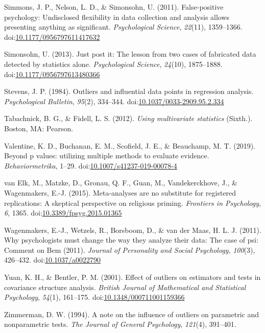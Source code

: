 \documentclass[english,,man,mask]{apa6}
\theoremstyle{definition}
\theoremstyle{definition}
\theoremstyle{definition}
\theoremstyle{remark}
\begin{document}
\hypertarget{ref-Simmons2011}{}
Simmons, J. P., Nelson, L. D., \& Simonsohn, U. (2011). False-positive
psychology: Undisclosed flexibility in data collection and analysis
allows presenting anything as significant. \emph{Psychological Science},
\emph{22}(11), 1359--1366.
doi:\href{https://doi.org/10.1177/0956797611417632}{10.1177/0956797611417632}

\hypertarget{ref-Simonsohn2013}{}
Simonsohn, U. (2013). Just post it: The lesson from two cases of
fabricated data detected by statistics alone. \emph{Psychological
Science}, \emph{24}(10), 1875--1888.
doi:\href{https://doi.org/10.1177/0956797613480366}{10.1177/0956797613480366}

\hypertarget{ref-Stevens1984}{}
Stevens, J. P. (1984). Outliers and influential data points in
regression analysis. \emph{Psychological Bulletin}, \emph{95}(2),
334--344.
doi:\href{https://doi.org/10.1037/0033-2909.95.2.334}{10.1037/0033-2909.95.2.334}

\hypertarget{ref-Tabachnick2012}{}
Tabachnick, B. G., \& Fidell, L. S. (2012). \emph{Using multivariate
statistics} (Sixth.). Boston, MA: Pearson.

\hypertarget{ref-Valentine2017}{}
Valentine, K. D., Buchanan, E. M., Scofield, J. E., \& Beauchamp, M. T.
(2019). Beyond p values: utilizing multiple methods to evaluate
evidence. \emph{Behaviormetrika}, 1--29.
doi:\href{https://doi.org/10.1007/s41237-019-00078-4}{10.1007/s41237-019-00078-4}

\hypertarget{ref-VanElk2015}{}
van Elk, M., Matzke, D., Gronau, Q. F., Guan, M., Vandekerckhove, J., \&
Wagenmakers, E.-J. (2015). Meta-analyses are no substitute for
registered replications: A skeptical perspective on religious priming.
\emph{Frontiers in Psychology}, \emph{6}, 1365.
doi:\href{https://doi.org/10.3389/fpsyg.2015.01365}{10.3389/fpsyg.2015.01365}

\hypertarget{ref-Wagenmakers2011a}{}
Wagenmakers, E.-J., Wetzels, R., Borsboom, D., \& van der Maas, H. L. J.
(2011). Why psychologists must change the way they analyze their data:
The case of psi: Comment on Bem (2011). \emph{Journal of Personality and
Social Psychology}, \emph{100}(3), 426--432.
doi:\href{https://doi.org/10.1037/a0022790}{10.1037/a0022790}

\hypertarget{ref-Yuan2001}{}
Yuan, K. H., \& Bentler, P. M. (2001). Effect of outliers on estimators
and tests in covariance structure analysis. \emph{British Journal of
Mathematical and Statistical Psychology}, \emph{54}(1), 161--175.
doi:\href{https://doi.org/10.1348/000711001159366}{10.1348/000711001159366}

\hypertarget{ref-Zimmerman1994}{}
Zimmerman, D. W. (1994). A note on the influence of outliers on
parametric and nonparametric tests. \emph{The Journal of General
Psychology}, \emph{121}(4), 391--401.
\end{document}
